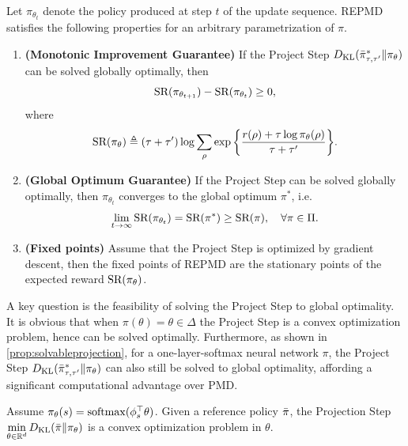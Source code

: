 \begin{thm}
\label{thm:monotonically_increasing_sr_property}
Let $\pi_{\theta_{t}}$ denote the policy produced at step $t$ of the update
sequence.
REPMD satisfies the following properties for an arbitrary parametrization of $\pi$.
\begin{enumerate}
	\item {\bf (Monotonic Improvement Guarantee)} 
	If the Project Step $D_{\mathrm{KL}}( \bar{\pi}_{\tau,\tau^{\prime}}^* \| \pi_\theta )$ can be solved globally optimally,
then 
	\begin{equation*}
	\text{SR}(\pi_{\theta_{t+1}}) - \text{SR}(\pi_{\theta_t})\ge 0,
	\end{equation*}
	where
	\begin{equation}
	\label{eq:SR}
	\text{SR}(\pi_\theta) \triangleq (\tau + \tau^{\prime})\log{ \sum_{\rho}{ \exp\left\{ \frac{r(\rho) + \tau \log{\pi_\theta(\rho)} }{\tau + \tau^{\prime}} \right\} }}.
	\end{equation}
	\item  {\bf (Global Optimum Guarantee)} If the Project Step can be solved globally optimally, then $ \pi_{\theta_{t}}$ converges to the global optimum $\pi^*$, i.e. 
	\[
\lim_{t\rightarrow\infty}\text{SR}(\pi_{\theta_t})=
	\text{SR}(\pi^*) \ge  \text{SR}(\pi), \quad \forall \pi\in\Pi.
	\]
	\item {\bf (Fixed points)} Assume that the Project Step is optimized by gradient descent, then the fixed points of REPMD are the 
	stationary points of the expected reward $\text{SR}(\pi_\theta)$. 
\end{enumerate}
\end{thm}

A key question is the feasibility of solving the
Project Step to global optimality.
It is obvious that when $\pi(\theta) = \theta \in \Delta$
the Project Step is a convex optimization problem,
hence can be solved optimally.
Furthermore, as shown in \cref{prop:solvableprojection}, 
for a one-layer-softmax neural network $\pi$,
the Project Step $D_{\mathrm{KL}}( \bar{\pi}_{\tau,\tau^{\prime}}^* \| \pi_\theta)$
can also still be solved to global optimality,
affording a significant computational advantage over PMD.

\begin{prop}
\label{prop:solvableprojection}
Assume $\pi_\theta(s) = \mathrm{softmax}(\phi_s^{\top}\theta)$.
Given a reference policy $\bar{\pi}$,
the Projection Step
$\min\limits_{\theta \in \mathbb{R}^d}{D_{\mathrm{KL}}(\bar{\pi} \| \pi_\theta)}$
is a convex optimization problem in $\theta$.
\end{prop}


